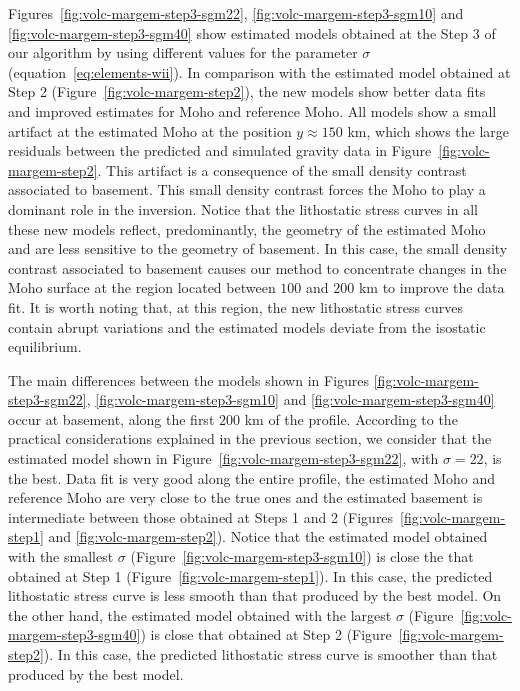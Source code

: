 \documentclass[manuscript]{geophysics}
\begin{document}
Figures~\ref{fig:volc-margem-step3-sgm22}, \ref{fig:volc-margem-step3-sgm10} and 
\ref{fig:volc-margem-step3-sgm40} show estimated models obtained at
the Step 3 of our algorithm by using different values for the parameter $\sigma$
(equation~\ref{eq:elements-wii}).
In comparison with the estimated model obtained at Step 2 
(Figure~\ref{fig:volc-margem-step2}), the new models 
show better data fits and improved estimates for Moho and reference Moho.
All models show a small artifact at the estimated Moho at the position
$y \approx 150$ km, which shows the large residuals between the predicted
and simulated gravity data in Figure~\ref{fig:volc-margem-step2}. 
This artifact is a consequence of the small density contrast associated 
to basement. This small density contrast forces the Moho to play a dominant role in the inversion.
Notice that the lithostatic stress curves in all these new models reflect, predominantly, 
the geometry of the estimated Moho and are less sensitive to the geometry of basement.
In this case, the small density contrast associated to basement causes our method to concentrate
changes in the Moho surface at the region located between $100$ and $200$ km to improve the data fit.
It is worth noting that, at this region, the new lithostatic stress curves contain abrupt variations
and the estimated models deviate from the isostatic equilibrium.

The main differences between the models shown in 
Figures \ref{fig:volc-margem-step3-sgm22}, \ref{fig:volc-margem-step3-sgm10} and 
\ref{fig:volc-margem-step3-sgm40} occur at basement,
along the first $200$ km of the profile.
According to the practical considerations explained in the previous section, 
we consider that the estimated model shown in Figure~\ref{fig:volc-margem-step3-sgm22},
with $\sigma = 22$, is the best. 
Data fit is very good along the entire profile, the estimated Moho and
reference Moho are very close to the true ones and the estimated basement is intermediate
between those obtained at Steps 1 and 2 (Figures~\ref{fig:volc-margem-step1} and
\ref{fig:volc-margem-step2}).
Notice that the estimated model obtained with 
the smallest $\sigma$ (Figure~\ref{fig:volc-margem-step3-sgm10}) is close the that 
obtained at Step 1 (Figure~\ref{fig:volc-margem-step1}).
In this case, the predicted lithostatic stress curve is less smooth than that
produced by the best model.
On the other hand, the estimated model obtained with 
the largest $\sigma$ (Figure~\ref{fig:volc-margem-step3-sgm40}) is close that 
obtained at Step 2 (Figure~\ref{fig:volc-margem-step2}).
In this case, the predicted lithostatic stress curve is smoother than that
produced by the best model.
\end{document}

